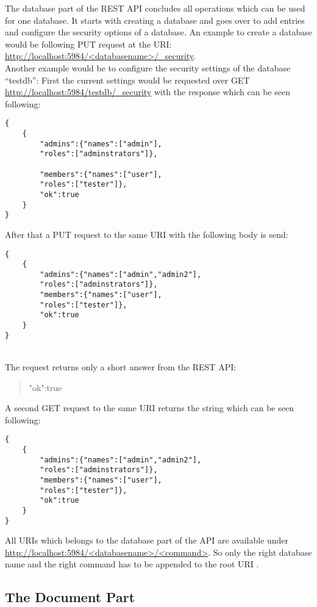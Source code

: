 The database part of the REST API concludes all operations which can be used for one database. It starts with creating a database and goes over to add entries and configure the security options of a database.
An example to create a database would be following PUT request at the URI:
\url{http://localhost:5984/<databasename>/_security}. \\
Another example would be to configure the security settings of the database “testdb”:
First the current settings would be requested over GET  \url{http://localhost:5984/testdb/_security} with the response which can be seen following: 
\begin{lstlisting}[frame=single, caption= Example security response]
{
    {
        "admins":{"names":["admin"],
        "roles":["adminstrators"]},
        
        "members":{"names":["user"],
        "roles":["tester"]},
        "ok":true
    }
}
\end{lstlisting} 
\newpage 
After that a PUT request to the same URI with the following body is send:
\begin{lstlisting}[frame=single, caption= Put request body]
{
    {
        "admins":{"names":["admin","admin2"],
        "roles":["adminstrators"]},
        "members":{"names":["user"],
        "roles":["tester"]},
        "ok":true
    } 
}
\end{lstlisting} \\
The request returns only a short answer from the REST API: 
\begin{quote}{"ok":true} \end{quote}
A second GET request to the same URI returns the string which can be seen following:
\begin{lstlisting}[frame=single, caption=  Get response]
{
    {
        "admins":{"names":["admin","admin2"],
        "roles":["adminstrators"]},
        "members":{"names":["user"],
        "roles":["tester"]},
        "ok":true
    }
}
\end{lstlisting}
All URIs which belongs to the database part of the API are available under  \url{http://localhost:5984/<databasename>/<command>}. So only the right database name and the right command has to be appended to the root URI \parencite{CouchDBRestDatabases}.

\subsection{The Document Part}

